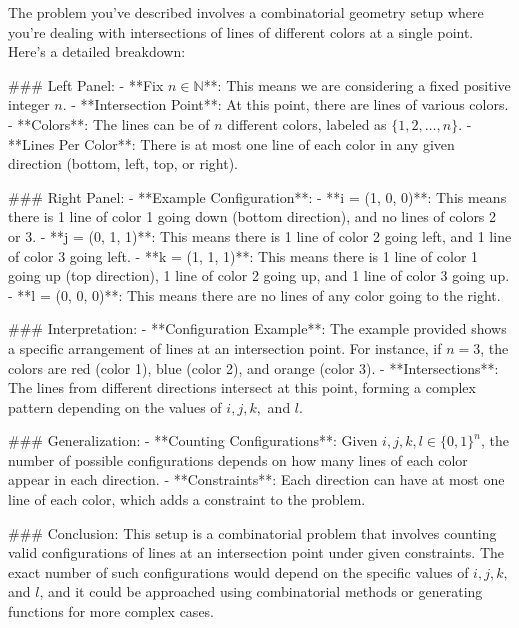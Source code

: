 The problem you've described involves a combinatorial geometry setup where you're dealing with intersections of lines of different colors at a single point. Here's a detailed breakdown:

### Left Panel:
- **Fix \( n \in \mathbb{N} \)**: This means we are considering a fixed positive integer \( n \).
- **Intersection Point**: At this point, there are lines of various colors.
- **Colors**: The lines can be of \( n \) different colors, labeled as \( \{1, 2, \ldots, n\} \).
- **Lines Per Color**: There is at most one line of each color in any given direction (bottom, left, top, or right).

### Right Panel:
- **Example Configuration**:
  - **i = (1, 0, 0)**: This means there is 1 line of color 1 going down (bottom direction), and no lines of colors 2 or 3.
  - **j = (0, 1, 1)**: This means there is 1 line of color 2 going left, and 1 line of color 3 going left.
  - **k = (1, 1, 1)**: This means there is 1 line of color 1 going up (top direction), 1 line of color 2 going up, and 1 line of color 3 going up.
  - **l = (0, 0, 0)**: This means there are no lines of any color going to the right.

### Interpretation:
- **Configuration Example**: The example provided shows a specific arrangement of lines at an intersection point. For instance, if \( n = 3 \), the colors are red (color 1), blue (color 2), and orange (color 3).
- **Intersections**: The lines from different directions intersect at this point, forming a complex pattern depending on the values of \( i, j, k, \) and \( l \).

### Generalization:
- **Counting Configurations**: Given \( i, j, k, l \in \{0, 1\}^n \), the number of possible configurations depends on how many lines of each color appear in each direction.
- **Constraints**: Each direction can have at most one line of each color, which adds a constraint to the problem.

### Conclusion:
This setup is a combinatorial problem that involves counting valid configurations of lines at an intersection point under given constraints. The exact number of such configurations would depend on the specific values of \( i, j, k, \) and \( l \), and it could be approached using combinatorial methods or generating functions for more complex cases.